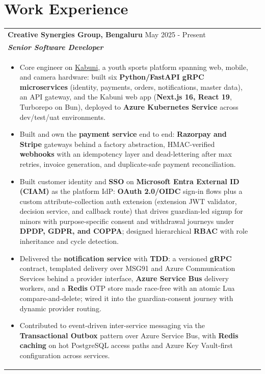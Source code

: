 \documentclass[a4paper,8pt]{article}
\begin{document}
\section{Work Experience}
\begin{tabularx}{\linewidth}{ @{}l r@{} }
\textbf{{Creative Synergies Group, Bengaluru}} \hfill \color[HTML]{371e77} May 2025 - Present \\[4pt]
\color[HTML]{371e77}\textbf{\textit{Senior Software Developer}}\ \hfill \color[HTML]{4B28A4} \\[5pt]
\begin{minipage}[t]{\linewidth}
    \begin{itemize}[nosep,after=\strut, leftmargin=2em, itemsep=2pt]
        \item Core engineer on \href{https://www.kabuni.com/}{Kabuni}, a youth sports platform spanning web, mobile, and camera hardware: built six \textbf{Python/FastAPI gRPC microservices} (identity, payments, orders, notifications, master data), an API gateway, and the Kabuni web app (\textbf{Next.js 16, React 19}, Turborepo on Bun), deployed to \textbf{Azure Kubernetes Service} across dev/test/uat environments.
        \item Built and own the \textbf{payment service} end to end: \textbf{Razorpay and Stripe} gateways behind a factory abstraction, HMAC-verified \textbf{webhooks} with an idempotency layer and dead-lettering after max retries, invoice generation, and duplicate-safe payment reconciliation.
        \item Built customer identity and \textbf{SSO} on \textbf{Microsoft Entra External ID (CIAM)} as the platform IdP: \textbf{OAuth 2.0/OIDC} sign-in flows plus a custom attribute-collection auth extension (extension JWT validator, decision service, and callback route) that drives guardian-led signup for minors with purpose-specific consent and withdrawal journeys under \textbf{DPDP, GDPR, and COPPA}; designed hierarchical \textbf{RBAC} with role inheritance and cycle detection.
        \item Delivered the \textbf{notification service} with \textbf{TDD}: a versioned \textbf{gRPC} contract, templated delivery over MSG91 and Azure Communication Services behind a provider interface, \textbf{Azure Service Bus} delivery workers, and a \textbf{Redis} OTP store made race-free with an atomic Lua compare-and-delete; wired it into the guardian-consent journey with dynamic provider routing.
        \item Contributed to event-driven inter-service messaging via the \textbf{Transactional Outbox} pattern over Azure Service Bus, with \textbf{Redis caching} on hot PostgreSQL access paths and Azure Key Vault-first configuration across services.

\end{itemize}
\end{minipage}
\end{tabularx}
\end{document}
